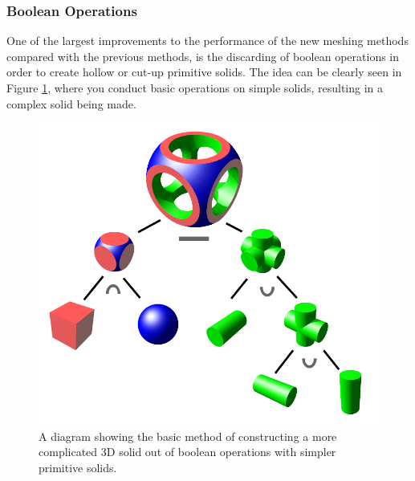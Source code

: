 \documentclass[12pt,a4paper]{article}
\begin{document}
\subsubsection{Boolean Operations}
\label{bool}
One of the largest improvements to the performance of the new meshing methods compared with the previous methods, is the discarding of boolean operations in order to create hollow or cut-up primitive solids. The idea can be clearly seen in Figure \ref{booly}, where you conduct basic operations on simple solids, resulting in a complex solid being made.
\\
\begin{figure}[h!]
\centering
\includegraphics[scale=0.3]{Images//Booleans//Boolean.png}
\caption[width=\columnwidth]{A diagram showing the basic method of constructing a more complicated 3D solid out of boolean operations with simpler primitive solids.}
\label{booly}
\end{figure}
\end{document}
